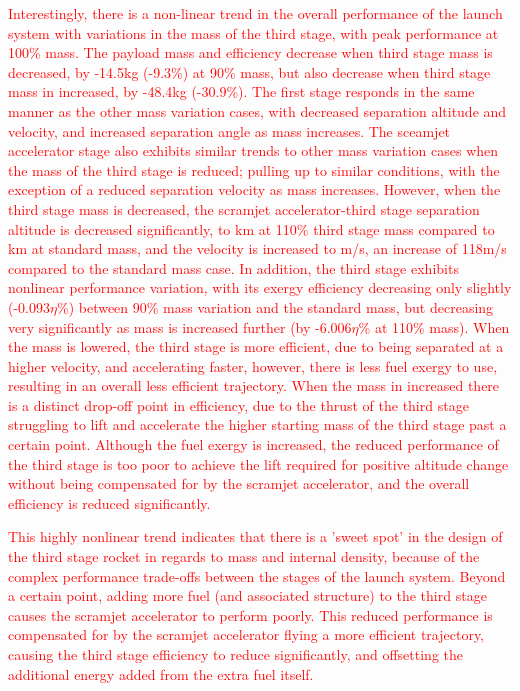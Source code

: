 \textcolor{red}{Interestingly, there is a non-linear trend in the overall performance of the launch system with variations in the mass of the third stage, with peak performance at 100\% mass. The payload mass and efficiency decrease when third stage mass is decreased, by -14.5kg (-9.3\%) at 90\% mass, but also decrease when third stage mass in increased, by -48.4kg (-30.9\%). 
	The first stage responds in the same manner as the other mass variation cases, with decreased separation altitude and velocity, and increased separation angle as mass increases. The sceamjet accelerator stage also exhibits similar trends to other mass variation cases when the mass of the third stage is reduced; pulling up to similar conditions, with the exception of a reduced separation velocity as mass increases. However, when the third stage mass is decreased, the scramjet accelerator-third stage separation altitude is decreased significantly, to \secondthirdSeparationAltmThreeOneHundredTenNoReturn km at 110\% third stage mass compared to \secondthirdSeparationAltStandardNoReturn km at standard mass, and the velocity is increased to \secondthirdSeparationvmThreeOneHundredTenNoReturn m/s, an increase of 118m/s compared to the standard mass case. In addition, the third stage exhibits nonlinear performance variation, with its exergy efficiency decreasing only slightly (-0.093$\eta$\%) between 90\% mass variation and the standard mass, but decreasing very significantly as mass is increased further (by -6.006$\eta$\% at 110\% mass). When the mass is lowered, the third stage is more efficient, due to being separated at a higher velocity, and accelerating faster, however, there is less fuel exergy to use, resulting in an overall less efficient trajectory. When the mass in increased there is a distinct drop-off point in efficiency, due to the thrust of the third stage struggling to lift and accelerate the higher starting mass of the third stage past a certain point. Although the fuel exergy is increased, the reduced performance of the third stage is too poor to achieve the lift required for positive altitude change without being compensated for by the scramjet accelerator, and the overall efficiency is reduced significantly. 
}

\textcolor{red}{This highly nonlinear trend indicates that there is a 'sweet spot' in the design of the third stage rocket in regards to mass and internal density, because of the complex performance trade-offs between the stages of the launch system. Beyond a certain point, adding more fuel (and associated structure) to the third stage causes the scramjet accelerator to perform poorly. This reduced performance is compensated for by the scramjet accelerator flying a more efficient trajectory, causing the third stage efficiency to reduce significantly, and offsetting the additional energy added from the extra fuel itself.}

